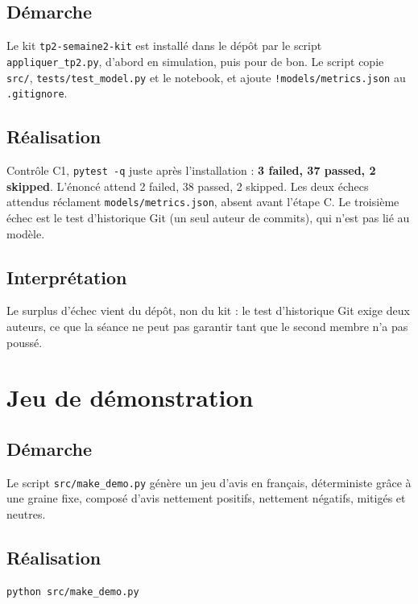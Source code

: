 \documentclass[11pt,a4paper]{article}
\begin{document}
\subsection{Démarche}

Le kit \texttt{tp2-semaine2-kit} est installé dans le dépôt par le script \texttt{appliquer\_tp2.py}, d'abord en simulation, puis pour de bon. Le script copie \texttt{src/}, \texttt{tests/test\_model.py} et le notebook, et ajoute \texttt{!models/metrics.json} au \texttt{.gitignore}.

\subsection{Réalisation}

Contrôle C1, \texttt{pytest -q} juste après l'installation : \textbf{3 failed, 37 passed, 2 skipped}. L'énoncé attend 2 failed, 38 passed, 2 skipped. Les deux échecs attendus réclament \texttt{models/metrics.json}, absent avant l'étape C. Le troisième échec est le test d'historique Git (un seul auteur de commits), qui n'est pas lié au modèle.

\subsection{Interprétation}

Le surplus d'échec vient du dépôt, non du kit : le test d'historique Git exige deux auteurs, ce que la séance ne peut pas garantir tant que le second membre n'a pas poussé.

\section{Jeu de démonstration}

\subsection{Démarche}

Le script \texttt{src/make\_demo.py} génère un jeu d'avis en français, déterministe grâce à une graine fixe, composé d'avis nettement positifs, nettement négatifs, mitigés et neutres.

\subsection{Réalisation}

\begin{verbatim}
python src/make_demo.py
\end{verbatim}
\end{document}
